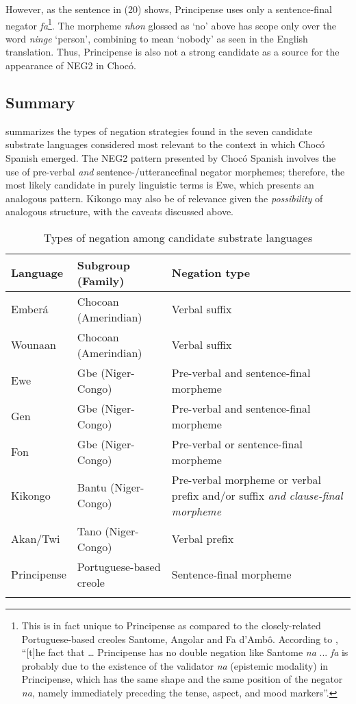 \documentclass[output=paper,colorlinks,citecolor=brown]{langscibook}
\begin{document}
However, as the sentence in (20) shows, Principense uses only a sentence-final negator \emph{fa}\footnote{This is in fact unique to Principense as compared to the closely-related Portuguese-based creoles Santome, Angolar and Fa d’Ambô. According to \citet{Maurer_2013}, “[t]he fact that … Principense has no double negation like Santome \emph{na} ... \emph{fa} is probably due to the existence of the validator \emph{na} (epistemic modality) in Principense, which has the same shape and the same position of the negator \emph{na}, namely immediately preceding the tense, aspect, and mood markers”.}. The morpheme \emph{nhon} glossed as ‘no’ above has scope only over the word \emph{ninge} ‘person’, combining to mean ‘nobody’ as seen in the English translation. Thus, Principense is also not a strong candidate as a source for the appearance of NEG2 in Chocó.

\subsection{Summary}

 summarizes the types of negation strategies found in the seven candidate substrate languages considered most relevant to the context in which Chocó Spanish emerged. The NEG2 pattern presented by Chocó Spanish involves the use of pre-verbal \emph{and} sentence-\slash utterancefinal negator morphemes; therefore, the most likely candidate in purely linguistic terms is Ewe, which presents an analogous pattern. Kikongo may also be of relevance given the \emph{possibility} of analogous structure, with the caveats discussed above. 

\begin{table}\small
\begin{tabularx}{\textwidth}{llQ}
    \lsptoprule
    Language & Subgroup (Family) & Negation type\\ \midrule
    Emberá   & Chocoan (Amerindian) & Verbal suffix \\
    Wounaan  & Chocoan (Amerindian) & Verbal suffix \\
    Ewe      & Gbe (Niger-Congo) & Pre-verbal and sentence-final morpheme \\
    Gen      & Gbe (Niger-Congo) & Pre-verbal and sentence-final morpheme \\
    Fon      & Gbe (Niger-Congo) & Pre-verbal or sentence-final morpheme \\
    Kikongo  & Bantu (Niger-Congo) & Pre-verbal morpheme or verbal prefix and/or suffix \textit{and clause-final morpheme}\\
    Akan/Twi & Tano (Niger-Congo) & Verbal prefix \\
    Principense & Portuguese-based creole & Sentence-final morpheme \\ \lspbottomrule
\end{tabularx}
\caption{Types of negation among candidate substrate languages}
\label{tab:tab5_05}
\end{table}
\end{document}
